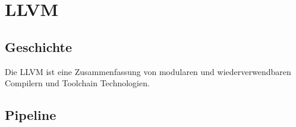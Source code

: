 \chapter{LLVM}
\section{Geschichte}
Die \ac{LLVM} ist eine Zusammenfassung von modularen und wiederverwendbaren Compilern und Toolchain Technologien. \cite{LLVMWebsite}

\section{Pipeline}
